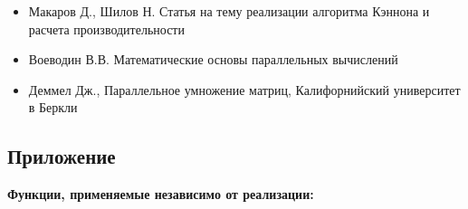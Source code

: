 \documentclass[20pt]{article}
\begin{document}
\begin{itemize}
    \item Макаров Д., Шилов Н. Статья на тему реализации алгоритма Кэннона и расчета производительности
    \item Воеводин В.В. Математические основы параллельных вычислений
    \item Деммел Дж., Параллельное умножение матриц, Калифорнийский университет в Беркли
\end{itemize}
\newpage
\begin{center}
    \section{Приложение}
\end{center}

\textbf{Функции, применяемые независимо от реализации:}
\end{document}
